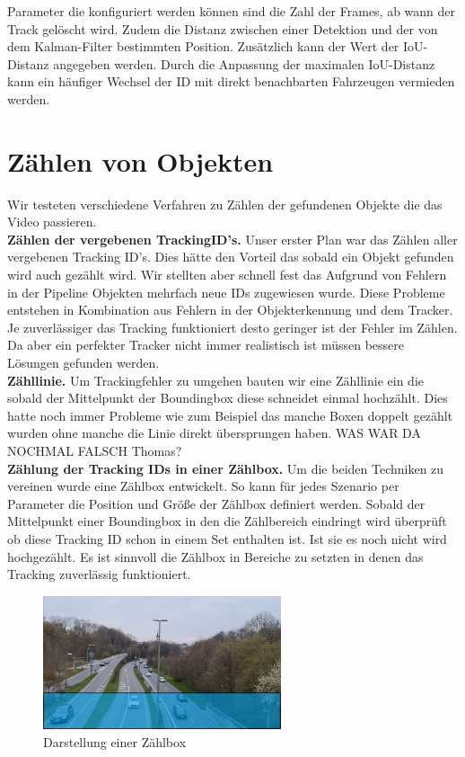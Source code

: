 \documentclass[conference]{IEEEtran}
\begin{document}
	Parameter die konfiguriert werden können sind die Zahl der Frames, ab wann der
	Track gelöscht wird. Zudem die Distanz zwischen einer Detektion und der von dem
	Kalman-Filter bestimmten Position. Zusätzlich kann der Wert der IoU-Distanz angegeben werden.
	Durch die Anpassung der maximalen IoU-Distanz
	kann ein häufiger Wechsel der ID mit direkt benachbarten Fahrzeugen vermieden werden.
	
	
	

	
	\section{Zählen von Objekten}
	Wir testeten verschiedene Verfahren zu Zählen der gefundenen Objekte die das Video passieren.\\
	\textbf{Zählen der vergebenen TrackingID's.} Unser erster Plan war das Zählen aller vergebenen Tracking ID's. Dies hätte den Vorteil das sobald ein Objekt gefunden wird auch gezählt wird. Wir stellten aber schnell fest das Aufgrund von Fehlern in der Pipeline Objekten mehrfach neue IDs zugewiesen wurde. Diese Probleme entstehen in Kombination aus Fehlern in der Objekterkennung und dem Tracker. Je zuverlässiger das Tracking funktioniert desto geringer ist der Fehler im Zählen. Da aber ein perfekter Tracker nicht immer realistisch ist müssen bessere Lösungen gefunden werden.\\
	\textbf{Zähllinie.} Um Trackingfehler zu umgehen bauten wir eine Zähllinie ein die sobald der Mittelpunkt der Boundingbox diese schneidet einmal hochzählt. Dies hatte noch immer Probleme wie zum Beispiel das manche Boxen doppelt gezählt wurden ohne manche die Linie direkt übersprungen haben. WAS WAR DA NOCHMAL FALSCH Thomas?\\
	\textbf{Zählung der Tracking IDs in einer Zählbox.} Um die beiden Techniken zu vereinen wurde eine Zählbox entwickelt. So kann für jedes Szenario per Parameter die Position und Größe der Zählbox definiert werden. Sobald der Mittelpunkt einer Boundingbox in den die Zählbereich eindringt wird überprüft ob diese Tracking ID schon in einem Set enthalten ist. Ist sie es noch nicht wird hochgezählt. Es ist sinnvoll die Zählbox in Bereiche zu setzten in denen das Tracking zuverlässig funktioniert. 
	\begin{figure}[!h]
		\begin{center}
			\includegraphics[width=7cm]{Media/BrudermuhlCounter.png}
			\caption{Darstellung einer Zählbox}
			\label{Counter}
		\end{center}
	\end{figure}
	
\end{document}
